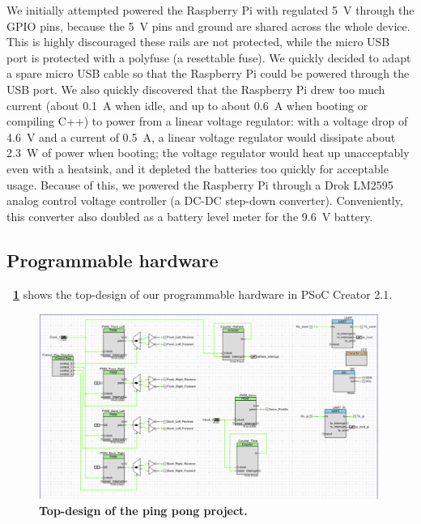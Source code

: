 \documentclass[letterpaper, 11pt]{article}
\newcommand*{\figref}[1]{\textbf{\figurename~\ref{#1}}}
\begin{document}
We initially attempted powered the Raspberry Pi with regulated \SI{5}{V} through the GPIO pins, because the \SI{5}{V} pins and ground are shared across the whole device. This is highly discouraged these rails are not protected, while the micro USB port is protected with a polyfuse (a resettable fuse). We quickly decided to adapt a spare micro USB cable so that the Raspberry Pi could be powered through the USB port. We also quickly discovered that the Raspberry Pi drew too much current (about \SI{0.1}{A} when idle, and up to about \SI{0.6}{A} when booting or compiling C++) to power from a linear voltage regulator: with a voltage drop of \SI{4.6}{V} and a current of \SI{0.5}{A}, a linear voltage regulator would dissipate about \SI{2.3}{W} of power when booting; the voltage regulator would heat up unacceptably even with a heatsink, and it depleted the batteries too quickly for acceptable usage. Because of this, we powered the Raspberry Pi through a Drok LM2595 analog control voltage controller (a DC-DC step-down converter). Conveniently, this converter also doubled as a battery level meter for the \SI{9.6}{V} battery.

\subsection{Programmable hardware}
\figref{fig:topdesign} shows the top-design of our programmable hardware in PSoC Creator 2.1.
\begin{figure}[ht]
    \centering
    \includegraphics[width=0.99\textwidth]{images/topdesign.pdf}
    \caption{\textbf{Top-design of the ping pong project.}}
    \label{fig:topdesign}
\end{figure}
\end{document}
